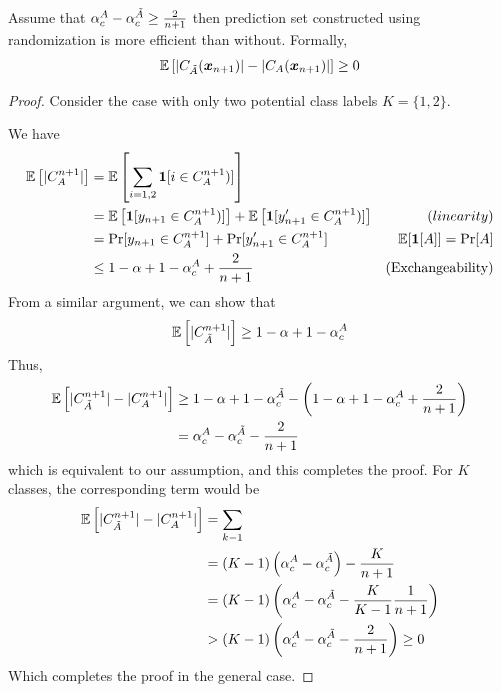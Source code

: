 \begin{theorem}
Assume that $\alpha_c^A - \alpha_c^{\Tilde{A}} \geq \frac{2}{n+1}$ then prediction set constructed using randomization is more efficient than without. Formally, 
\[
    \mathbb{E}\left[|C_{\Tilde{A}}({\bm{x}}_{n+1})| - |C_A({\bm{x}}_{n+1})|\right]  \geq 0
\]   
\label{them:APS:efficiency}
\end{theorem}
\begin{proof}
Consider the case with only two potential class labels $K = \{1, 2\}$. 

We have
\begin{align*}
    \mathbb{E}\left[|C_{A}^{n+1}|\right] &= \mathbb{E}\left[\sum\limits_{i=1, 2}\bm{1}[i \in C_{A}^{n+1})]\right] \\
                                 &= \mathbb{E}\left[\bm{1}[y_{n+1} \in C_{A}^{n+1})]\right] + \mathbb{E}\left[\bm{1}[y'_{n+1} \in C_{A}^{n+1})]\right]  & \text(linearity)\\
                                 &= \Pr[y_{n+1} \in C_{A}^{n+1}] + \Pr[y'_{n+1} \in C_{A}^{n+1}] & \text{$\mathbb{E}[\bm{1}[A]] = \Pr[A]$}\\
                                 &\leq 1 - \alpha + 1 - \alpha_c^A + \frac{2}{n+1} & \text{(Exchangeability)} 
\end{align*}
From a similar argument, we can show that 
\[
    \mathbb{E}\left[|C_{\Tilde{A}}^{n+1}|\right] \geq 1 - \alpha + 1 - \alpha_c^A
\]
Thus, 
\begin{align}
    \mathbb{E}\left[|C_{\Tilde{A}}^{n+1}| - |C_{A}^{n+1}|\right] &\geq 1 - \alpha + 1 - \alpha_c^{\Tilde{A}} - \left(1 - \alpha + 1 - \alpha_c^A + \frac{2}{n+1} \right)\\
    &= \alpha_c^A - \alpha_c^{\Tilde{A}} - \frac{2}{n+1}
\end{align}
which is equivalent to our assumption, and this completes the proof.
For $K$ classes, the corresponding term would be 
\begin{align*}
    \mathbb{E}\left[|C_{\Tilde{A}}^{n+1}| - |C_{A}^{n+1}|\right] &= \sum\limits_{k-1} \\
    &=(K-1)\left(\alpha_c^A - \alpha_c^{\Tilde{A}}\right) - \frac{K}{n+1} \\
    &= (K-1) \left(\alpha_c^A - \alpha_c^{\Tilde{A}} - \frac{K}{K-1} \frac{1}{n+1}\right)\\
    & >  (K-1)\left(\alpha_c^A - \alpha_c^{\Tilde{A}} - \frac{2}{n+1}\right) \geq 0
\end{align*}
Which completes the proof in the general case.

\end{proof}
